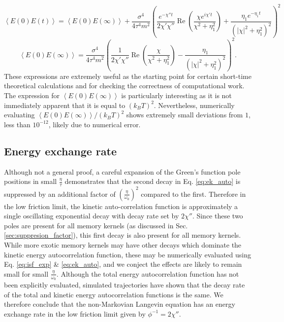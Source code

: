 \documentclass[7pt]{article}
\begin{document}
\begin{equation}
	\left<E(0)E(t)\right>=\left<E(0)E(\infty)\right> + \frac{\sigma^4}{4\tau^4m^2}\left(\frac{e^{-\chi''t}}{2\chi'\chi''}\operatorname{Re}\left(\frac{\chi e^{i\chi't}}{\chi^2+\eta_1^2}\right) + \frac{\eta_1e^{-\eta_1 t}}{\left(\left|\chi\right|^2 + \eta_1^2\right)^2} \right)^2 \label{eq:ek_auto}
\end{equation}
\begin{equation}
	\left<E(0)E(\infty)\right> = \frac{\sigma^4}{4\tau^4m^2}\left(\frac{1}{2\chi'\chi''}\operatorname{Re}\left(\frac{\chi}{\chi^2+\eta_1^2}\right) - \frac{\eta_1}{\left(\left|\chi\right|^2 + \eta_1^2\right)^2} \right)^2.
\end{equation}
These expressions are extremely useful as the starting point for certain short-time theoretical calculations and for checking the correctness of computational work. The expression for $\left<E(0)E(\infty)\right>$ is particularly interesting as it is not immediately apparent that it is equal to $(k_BT)^2$. Nevertheless, numerically evaluating $\left<E(0)E(\infty)\right>/(k_BT)^2$ shows extremely small deviations from $1$, less than $10^{-12}$, likely due to numerical error.

\subsection{Energy exchange rate}

Although not a general proof, a careful expansion of the Green's function pole positions in small $\frac{\eta}{\tau}$ demonstrates that the second decay in Eq. \ref{eq:ek_auto} is suppressed by an additional factor of $\left(\frac{\eta}{\omega_0}\right)^2$ compared to the first. Therefore in the low friction limit, the kinetic auto-correlation function is approximately a single oscillating exponential decay with decay rate set by $2\chi''$. Since these two poles are present for all memory kernels (as discussed in Sec. \ref{sec:suppresion_factor}), this first decay is also present for all memory kernels. While more exotic memory kernels may have other decays which dominate the kinetic energy autocorrelation function, these may be numerically evaluated using Eq. \ref{eq:isf_exp} \& \ref{eq:ek_auto}, and we conject the effects are likely to remain small for small $\frac{\eta}{\omega_0}$. Although the total energy autocorrelation function has not been explicitly evaluated, simulated trajectories have shown that the decay rate of the total and kinetic energy autocorrelation functions is the same. We therefore conclude that the non-Markovian Langevin equation has an energy exchange rate in the low friction limit given by $\phi^{-1} = 2\chi''$. 
\end{document}
